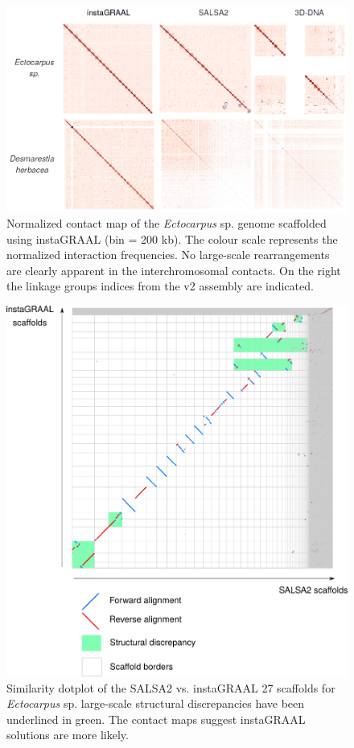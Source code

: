 \begin{suppsection}
\begin{figure}[ht]
\centering
    \includegraphics[width=13.5cm]{fig/instagraal/s7.png}
    \caption{Normalized contact map of the \textit{Ectocarpus} sp. genome scaffolded using instaGRAAL (bin = 200 kb). The colour scale represents the normalized interaction frequencies. No large-scale rearrangements are clearly apparent in the interchromosomal contacts. On the right the linkage groups indices from the v2 assembly are indicated.}
    \label{fig:instagraal_s7}
\end{figure}

\begin{figure}[ht]
\centering
    \includegraphics[width=13.5cm]{fig/instagraal/s8.png}
    \caption{Similarity dotplot of the SALSA2 vs. instaGRAAL 27 scaffolds for \textit{Ectocarpus} sp. large-scale structural discrepancies have been underlined in green. The contact maps suggest instaGRAAL solutions are more likely. }
    \label{fig:instagraal_s8}
\end{figure}


\end{suppsection}
